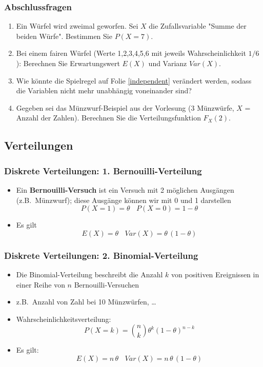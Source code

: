 \begin{frame}
    \frametitle{Abschlussfragen}

    \begin{enumerate}
        \item Ein Würfel wird zweimal geworfen. Sei $X$ die Zufallsvariable "Summe der beiden Würfe". Bestimmen Sie $P(X = 7)$.
        \item Bei einem fairen Würfel (Werte 1,2,3,4,5,6 mit jeweils Wahrscheinlichkeit $1/6$): Berechnen Sie Erwartungswert $E(X)$ und Varianz $Var(X)$.
        \item Wie könnte die Spielregel auf Folie \ref{independent} verändert werden, sodass die Variablen nicht mehr unabhängig voneinander sind?
        \item Gegeben sei das Münzwurf-Beispiel aus der Vorlesung (3 Münzwürfe, $X$ = Anzahl der Zahlen). Berechnen Sie die Verteilungsfunktion $F_X(2)$.
    \end{enumerate}
    
\end{frame}
\subsection{Verteilungen}
\begin{frame}
    \frametitle{Diskrete Verteilungen: 1. Bernouilli-Verteilung}

    \begin{itemize}
        \item Ein {\bf Bernouilli-Versuch} ist ein Versuch mit 2 möglichen Ausgängen (z.B.\ Münzwurf); diese Ausgänge können wir mit 0 und 1 darstellen
        $$
        P(X = 1) = \theta~~~~P(X = 0) = 1-\theta
        $$
        \item Es gilt
        $$
        E(X) = \theta ~~~~Var(X) =  \theta\,(1-\theta)
        $$
    \end{itemize}
\end{frame}

\begin{frame}
    \frametitle{Diskrete Verteilungen: 2. Binomial-Verteilung}

    \begin{itemize}
        \item Die Binomial-Verteilung beschreibt die Anzahl $k$ von positiven Ereignissen in einer Reihe von $n$ Bernouilli-Versuchen
        \item z.B.\ Anzahl von Zahl bei 10 Münzwürfen, \ldots
        \item Wahrscheinlichkeitsverteilung:
        $$
        P(X = k) = \binom{n}{k} \theta^k (1-\theta)^{n-k}
        $$
        \item Es gilt:
        $$
        E(X) = n\,\theta ~~~~Var(X) =  n\,\theta\,(1-\theta)
        $$
    \end{itemize}

\end{frame}

